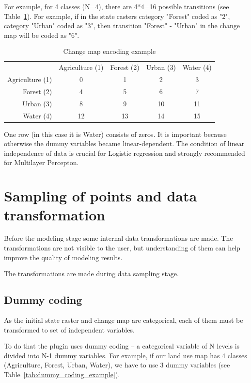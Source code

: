 \documentclass{report}
\begin{document}
For example, for 4 classes (N=4), there are 4*4=16 possible transitions (see Table~\ref{tab:changemap_encoding_example}).  
For example, if in the state rasters category "Forest" coded as "2", category "Urban" coded as "3", then transition "Forest" - "Urban" in the change map will be coded as "6". 

\begin{table}[]
\centering
\caption{Change map encoding example}
\begin{tabular}{rcccc}
           & Agriculture (1) & Forest (2) & Urban (3) & Water (4) \\
Agriculture (1) & 0          & 1          & 2  & 3          \\
Forest (2) &  4         & 5        & 6  & 7       \\
Urban (3) &  8     &   9    & 10  &   11  \\
Water (4) &  12   & 13 & 14  &  15          
\end{tabular}
\label{tab:changemap_encoding_example}
\end{table}
One row (in this case it is Water) consists of zeros.
It is important because otherwise the dummy variables became linear-dependent.
The condition of linear independence of data is crucial for Logistic regression and strongly recommended for Multilayer Percepton. 


\section{Sampling of points and data transformation}

Before the modeling stage some internal data transformations are made.
The transformations are not visible to the user, but understanding of them can help improve the quality of modeling results.

The transformations are made during data sampling stage.


\subsection{Dummy coding}\label{subsec:dummy_coding}
As the initial state raster and change map are categorical, each of them must be transformed to set of independent variables.

To do that the plugin uses dummy coding -- a categorical variable of N levels is divided into N-1 dummy variables. For example, if our land use map has 4 classes (Agriculture, Forest, Urban, Water), we have to use 3 dummy variables (see Table~\ref{tab:dummy_coding_example}). 
\end{document}
